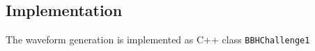 \documentclass[11pt]{report}
\begin{document}





\subsection{Implementation}

The waveform generation is implemented as C++ class {\tt BBHChallenge1}
\end{document}

